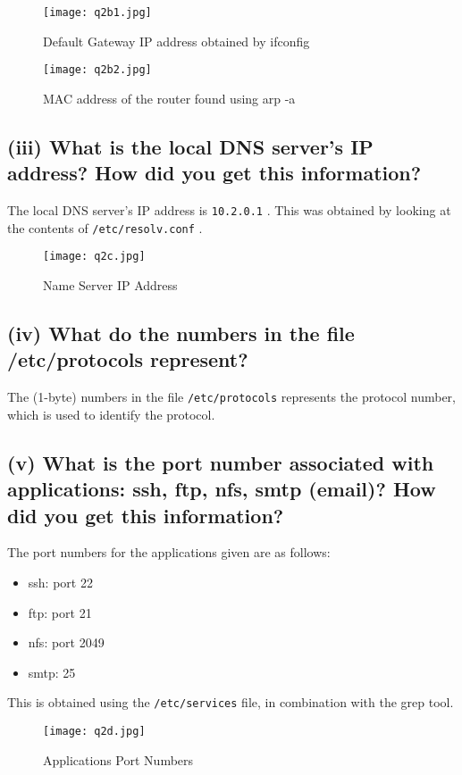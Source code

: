 \documentclass{article}
\let\oldtexttt\texttt
\renewcommand{\texttt}[1]{
  \colorbox{bgcolor}{\oldtexttt{#1}}
  }
\begin{document}
\begin{figure}[!hbt]
    \centering
    \texttt{[image: q2b1.jpg]}
    \caption{Default Gateway IP address obtained by ifconfig}
    \label{fig:my_label2b1}
\end{figure}
\begin{figure}[!hbt]
    \centering
    \texttt{[image: q2b2.jpg]}
    \caption{MAC address of the router found using arp -a}
    \label{fig:my_label2b2}
\end{figure}
\newpage

\subsection*{(iii) What is the local DNS server's IP address? How did you get this information?}
The local DNS server's IP address is \texttt{10.2.0.1}. This was obtained by looking at the contents of \texttt{/etc/resolv.conf}. 
\begin{figure}[!hbt]
    \centering
    \texttt{[image: q2c.jpg]}
    \caption{Name Server IP Address}
    \label{fig:my_label2c}
\end{figure}

\subsection*{(iv) What do the numbers in the file /etc/protocols represent?}
The (1-byte) numbers in the file \texttt{/etc/protocols} represents the protocol number, which is used to identify the protocol.

\subsection*{(v) What is the port number associated with applications: ssh, ftp, nfs, smtp (email)? How did you get this information?}
The port numbers for the applications given are as follows:
\begin{itemize}
    \item ssh: port 22
    \item ftp: port 21
    \item nfs: port 2049
    \item smtp: 25
\end{itemize}
This is obtained using the \texttt{/etc/services} file, in combination with the grep tool.

\begin{figure}[!hbt]
    \centering
    \texttt{[image: q2d.jpg]}
    \caption{Applications Port Numbers}
    \label{fig:my_label2d}
\end{figure}
\end{document}
